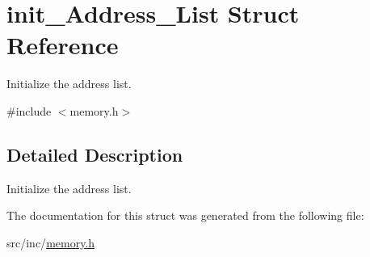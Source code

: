 \hypertarget{structinit___address___list}{}\section{init\+\_\+\+Address\+\_\+\+List Struct Reference}
\label{structinit___address___list}


Initialize the address list.  




{\ttfamily \#include $<$memory.\+h$>$}



\subsection{Detailed Description}
Initialize the address list. 

The documentation for this struct was generated from the following file\+:\begin{DoxyCompactItemize}
\item 
src/inc/\mbox{\hyperlink{memory_8h}{memory.\+h}}\end{DoxyCompactItemize}
